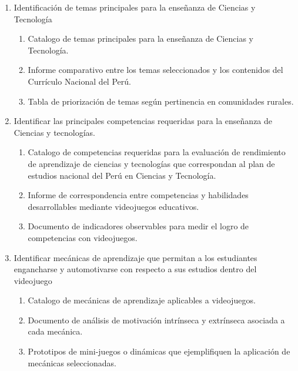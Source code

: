\begin{enumerate}[label=O\arabic*.,itemsep=5pt]
    \item Identificación de temas principales para la enseñanza de Ciencias y Tecnología
    
    \begin{enumerate}[label=R\arabic{enumi}.\arabic*.]
        \item Catalogo de temas principales para la enseñanza de Ciencias y Tecnología.
        \item Informe comparativo entre los temas seleccionados y los contenidos del Currículo Nacional del Perú.
        \item Tabla de priorización de temas según pertinencia en comunidades rurales.
    \end{enumerate}

    \item Identificar las principales competencias requeridas para la enseñanza de Ciencias y tecnologías.
    
    \begin{enumerate}[label=R\arabic{enumi}.\arabic*.]
        \item Catalogo de competencias requeridas para la evaluación de rendimiento de aprendizaje de ciencias y tecnologías que correspondan al plan de estudios nacional del Perú en Ciencias y Tecnología.
        \item Informe de correspondencia entre competencias y habilidades desarrollables mediante videojuegos educativos. %
        \item Documento de indicadores observables para medir el logro de competencias con videojuegos.
    \end{enumerate}

    \item Identificar mecánicas de aprendizaje que permitan a los estudiantes engancharse y automotivarse con respecto a sus estudios dentro del videojuego
    
     \begin{enumerate}[label=R\arabic{enumi}.\arabic*.]
        \item Catalogo de mecánicas de aprendizaje aplicables a videojuegos.
        \item Documento de análisis de motivación intrínseca y extrínseca asociada a cada mecánica.
        \item Prototipos de mini-juegos o dinámicas que ejemplifiquen la aplicación de mecánicas seleccionadas.
    \end{enumerate}


\end{enumerate}
